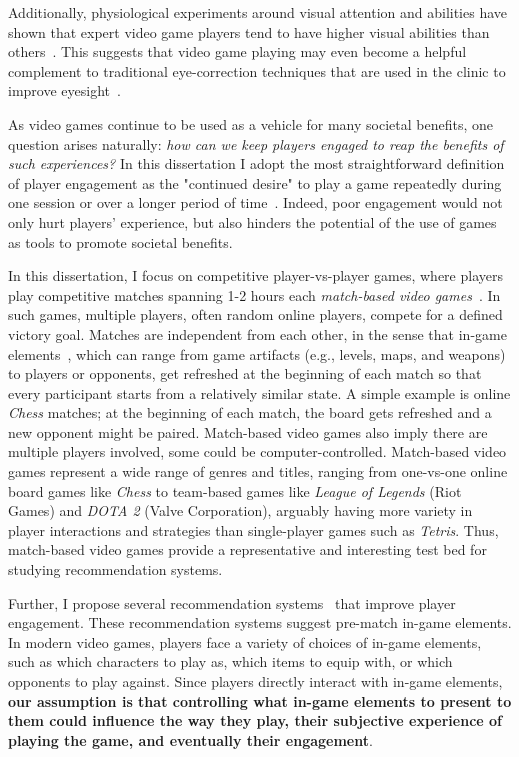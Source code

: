 Additionally, physiological experiments around visual attention and abilities have shown that expert video game players tend to have higher visual abilities than others~\citep{green2003action,li2009enhancing}. This suggests that video game playing may even become a helpful complement to traditional eye-correction techniques that are used in the clinic to improve eyesight~\citep{li2009enhancing}.

As video games continue to be used as a vehicle for many societal benefits, one question arises naturally: \textit{how can we keep players engaged to reap the benefits of such experiences?} In this dissertation I adopt the most straightforward definition of player engagement as the "continued desire" to play a game repeatedly during one session or over a longer period of time~\cite{schoenau2011player}. Indeed, poor engagement would not only hurt players' experience, but also hinders the potential of the use of  games as tools to promote societal benefits.  

In this dissertation, I focus on competitive player-vs-player games, where players play competitive matches spanning 1-2 hours each \textit{match-based video games}~\cite{guo2012analysis}. In such games, multiple players, often random online players, compete for a defined victory goal. Matches are independent from each other, in the sense that in-game elements~\cite{ralph2015toward,fullerton2008game}, which can range from game artifacts (e.g., levels, maps, and weapons) to players or opponents, get refreshed at the beginning of each match so that every participant starts from a relatively similar state. A simple example is online \textit{Chess} matches; at the beginning of each match, the board gets refreshed and a new opponent might be paired. Match-based video games also imply there are multiple players involved, some could be computer-controlled. Match-based video games represent a wide range of genres and titles, ranging from one-vs-one online board games like \textit{Chess} to team-based games like \textit{League of Legends} (Riot Games) and \textit{DOTA 2} (Valve Corporation), arguably having more variety in player interactions and strategies than single-player games such as \textit{Tetris}. Thus, match-based video games provide a representative and interesting test bed for studying recommendation systems.

Further, I propose several recommendation systems~\cite{medler2011using} that improve player engagement. These recommendation systems suggest pre-match in-game elements. In modern video games, players face a variety of choices of in-game elements, such as which characters to play as, which items to equip with, or which opponents to play against. Since players directly interact with in-game elements, \textbf{our assumption is that controlling what in-game elements to present to them could influence the way they play, their subjective experience of playing the game, and eventually their engagement}. 

